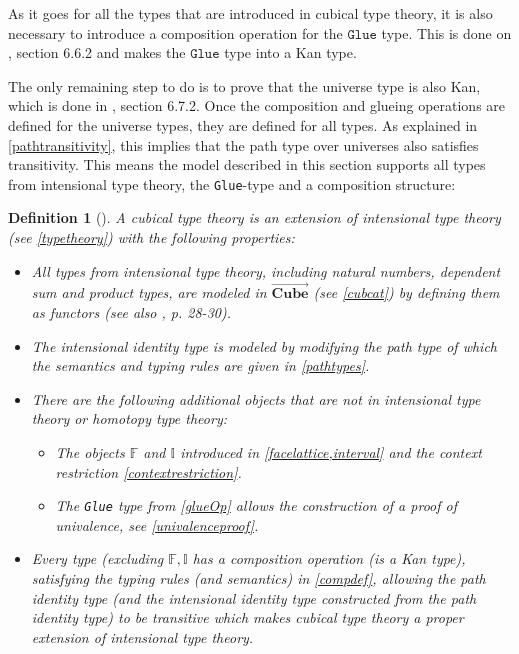 \documentclass[12pt,a4paper,twoside,xetex]{book} %
\newcommand{\keyword}[1]{\emph{#1}\index{#1}}
\newtheorem{definition}[theorem]{Definition}
\newcommand{\psh}[1]{\overrightarrow{#1}}
\newcommand{\op}[1]{\mathtt{#1}}
\newcommand{\cube}[0]{\textbf{Cube}}
\begin{document}
As it goes for all the types that are introduced in cubical type theory, it is 
also necessary to introduce a composition operation for the $\op{Glue}$ type. 
This is done on \cite{Huber2016}, section 6.6.2 and makes the $\op{Glue}$ type 
into a Kan type.

The only remaining step to do is to prove that the universe type is also Kan, 
which is done in \cite{Huber2016}, section 6.7.2. Once the composition and 
glueing operations are defined for the universe types, they are defined for all 
types. As explained in \cref{pathtransitivity}, this implies that the path type 
over universes also satisfies transitivity. This means the model described in 
this section supports all types from intensional type theory, the 
\texttt{Glue}-type and a composition structure:

\begin{definition}[\cite{Huber2016}]\label{ctt}
A \keyword{cubical type theory} is an 
extension of intensional type theory (see \cref{typetheory}) with the following 
properties:
\begin{itemize}
 \item All types from intensional type theory, including natural numbers, 
dependent sum and product types, are modeled in $\psh{\cube}$ (see \cref{cubcat}) by defining them as functors (see also \cite{Huber2016}, 
p. 28-30).
 
 \item The intensional identity type is modeled by modifying the path type of 
which the semantics and typing rules are given in \cref{pathtypes}.
 
 \item There are the following additional objects that are not in intensional 
type theory or homotopy type theory:
 
 \begin{itemize}
 \item The objects $\mathbb{F}$ and $\mathbb{I}$ introduced in 
\cref{facelattice,interval} and the context restriction 
\cref{contextrestriction}.
  \item The \texttt{Glue} type from \cref{glueOp} allows the construction of a 
proof of univalence, see \cref{univalenceproof}.
 
 \end{itemize}
 \item Every type (excluding \(\mathbb{F}, \mathbb{I}\) has a composition operation (is a Kan type), 
satisfying the typing rules (and semantics) in \cref{compdef}, allowing the path identity type (and the intensional identity type constructed from the path identity type) to be transitive which makes cubical type theory a proper 
extension of intensional type theory.
\end{itemize} 
\end{definition}
\end{document}
